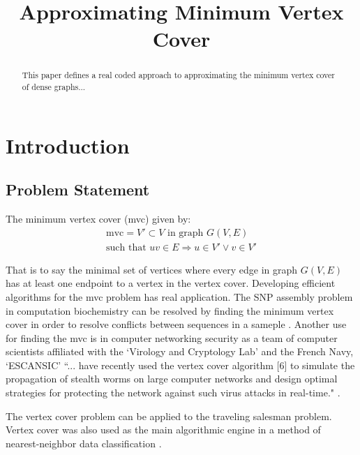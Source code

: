 \documentclass[conference,letterpaper]{IEEEtran}
\begin{document}
\title{Approximating Minimum Vertex Cover}
\author{
}

\maketitle

\begin{abstract}
    This paper defines a real coded approach to approximating the minimum vertex cover of dense graphs...
\end{abstract}

%
%   
\section{Introduction}
\subsection{Problem Statement}
\par The minimum vertex cover (mvc) given by:
\begin{equation}
    \begin{split}
        \mbox{mvc} = V' \subset V \mbox{ in graph } G(V,E) \\
        \mbox{such that } uv \in E \Rightarrow u \in V' \lor v \in V'
    \end{split}
\end{equation}

\par That is to say the minimal set of vertices where every edge in graph $G(V,E)$ has at least one endpoint to a vertex in the vertex cover. Developing efficient algorithms for the mvc problem has real application. The SNP assembly problem in computation biochemistry can be resolved by finding the minimum vertex cover in order to resolve conflicts between sequences in a sameple \cite{pirzada}. Another use for finding the mvc is in computer networking security as a team of computer scientists affiliated with the `Virology and Cryptology Lab' and the French Navy, `ESCANSIC' ``... have recently used the vertex cover algorithm [6] to simulate the propagation of stealth worms on large computer networks and design optimal strategies for protecting the network against such virus attacks in real-time." \cite{pirzada}. 
\par The vertex cover problem can be applied to the traveling salesman problem. Vertex cover was also used as the main algorithmic engine in a method of nearest-neighbor data classification \cite{gkk}.
\end{document}
